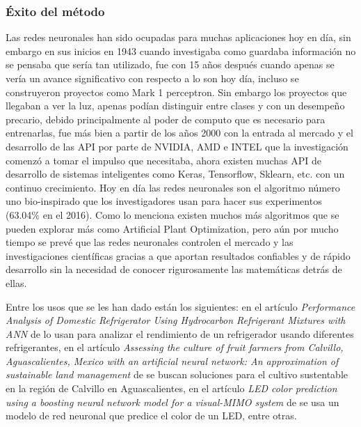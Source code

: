 \subsubsection{Éxito del método}

\par Las redes neuronales han sido ocupadas para muchas aplicaciones hoy en día, sin embargo en sus inicios en 1943 cuando \cite{mcculloch1943logical} investigaba como guardaba información no se pensaba que sería tan utilizado, fue con \cite{rosenblatt1958perceptron} 15 años después cuando apenas se vería un avance significativo con respecto a lo son hoy día, incluso se construyeron proyectos como Mark 1 perceptron. Sin embargo los proyectos que llegaban a ver la luz, apenas podían distinguir entre clases y con un desempeño precario, debido principalmente al poder de computo que es necesario para entrenarlas, fue más bien a partir de los años 2000 con la entrada al mercado y el desarrollo de las API por parte de NVIDIA, AMD e INTEL que la investigación comenzó a tomar el impulso que necesitaba, ahora existen muchas API de desarrollo de sistemas inteligentes como Keras, Tensorflow, Sklearn, etc. con un continuo crecimiento. Hoy en día las redes neuronales son el algoritmo número uno bio-inspirado que los investigadores usan para hacer sus experimentos (63.04\% en el 2016). Como lo menciona \cite{kar2016bio} existen muchos más algoritmos que se pueden explorar más como Artificial Plant Optimization, pero aún por mucho tiempo se prevé que las redes neuronales controlen el mercado y las investigaciones científicas gracias a que aportan resultados confiables y de rápido desarrollo sin la necesidad de conocer rigurosamente las matemáticas detrás de ellas.

\par Entre los usos que se les han dado están los siguientes: en el artículo \textit{Performance Analysis of Domestic Refrigerator Using Hydrocarbon Refrigerant Mixtures with ANN} de \cite{reddy2019performance} lo usan para analizar el rendimiento de un refrigerador usando diferentes refrigerantes, en el artículo \textit{Assessing the culture of fruit farmers from Calvillo, Aguascalientes, Mexico with an artificial neural network: An approximation of sustainable land management} de \cite{santos2019assessing} se buscan soluciones para el cultivo sustentable en la región de Calvillo en Aguascalientes, en el artículo \textit{LED color prediction using a boosting neural network model for a visual-MIMO system} de \cite{banik2018led} se usa un modelo de red neuronal que predice el color de un LED, entre otras.

